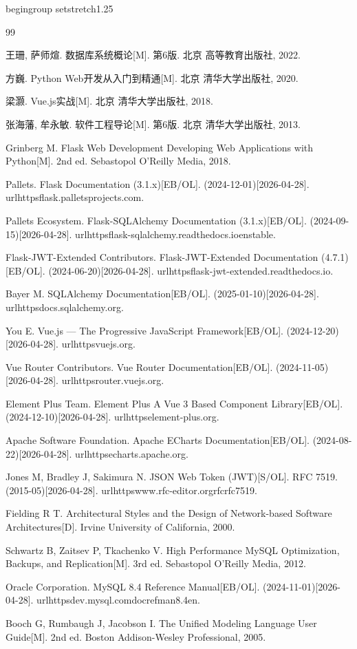 \documentclass[12pt,a4paper]{ctexart}
\begin{document}
\clearpage
\pagestyle{fancy}
\fancyhf{}
\cfoot{\thepage}
begingroup
setstretch{1.25}
\begin{thebibliography}{99}

王珊, 萨师煊. 数据库系统概论[M]. 第6版. 北京 高等教育出版社, 2022.

方巍. Python Web开发从入门到精通[M]. 北京 清华大学出版社, 2020.

梁灏. Vue.js实战[M]. 北京 清华大学出版社, 2018.

张海藩, 牟永敏. 软件工程导论[M]. 第6版. 北京 清华大学出版社, 2013.

Grinberg M. Flask Web Development Developing Web Applications with Python[M]. 2nd ed. Sebastopol O'Reilly Media, 2018.

Pallets. Flask Documentation (3.1.x)[EB/OL]. (2024-12-01)[2026-04-28]. url{httpsflask.palletsprojects.com}.

Pallets Ecosystem. Flask-SQLAlchemy Documentation (3.1.x)[EB/OL]. (2024-09-15)[2026-04-28]. url{httpsflask-sqlalchemy.readthedocs.ioenstable}.

Flask-JWT-Extended Contributors. Flask-JWT-Extended Documentation (4.7.1)[EB/OL]. (2024-06-20)[2026-04-28]. url{httpsflask-jwt-extended.readthedocs.io}.

Bayer M. SQLAlchemy Documentation[EB/OL]. (2025-01-10)[2026-04-28]. url{httpsdocs.sqlalchemy.org}.

You E. Vue.js --- The Progressive JavaScript Framework[EB/OL]. (2024-12-20)[2026-04-28]. url{httpsvuejs.org}.

Vue Router Contributors. Vue Router Documentation[EB/OL]. (2024-11-05)[2026-04-28]. url{httpsrouter.vuejs.org}.

Element Plus Team. Element Plus A Vue 3 Based Component Library[EB/OL]. (2024-12-10)[2026-04-28]. url{httpselement-plus.org}.

Apache Software Foundation. Apache ECharts Documentation[EB/OL]. (2024-08-22)[2026-04-28]. url{httpsecharts.apache.org}.

Jones M, Bradley J, Sakimura N. JSON Web Token (JWT)[S/OL]. RFC 7519. (2015-05)[2026-04-28]. url{httpswww.rfc-editor.orgrfcrfc7519}.

Fielding R T. Architectural Styles and the Design of Network-based Software Architectures[D]. Irvine University of California, 2000.

Schwartz B, Zaitsev P, Tkachenko V. High Performance MySQL Optimization, Backups, and Replication[M]. 3rd ed. Sebastopol O'Reilly Media, 2012.

Oracle Corporation. MySQL 8.4 Reference Manual[EB/OL]. (2024-11-01)[2026-04-28]. url{httpsdev.mysql.comdocrefman8.4en}.

Booch G, Rumbaugh J, Jacobson I. The Unified Modeling Language User Guide[M]. 2nd ed. Boston Addison-Wesley Professional, 2005.

\end{thebibliography}
\end{document}
